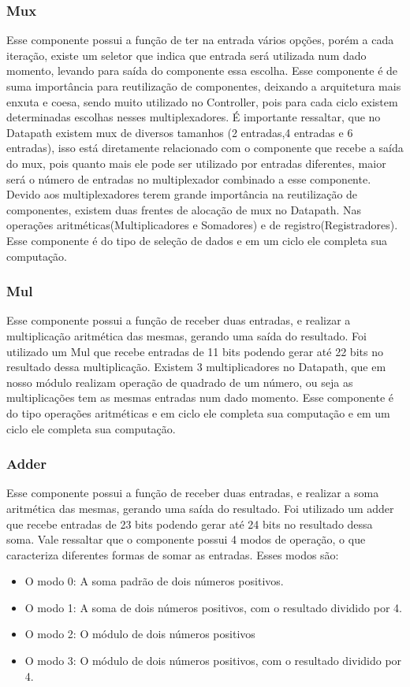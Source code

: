\subsubsection{Mux}
Esse componente possui a função de ter na entrada vários opções, porém a cada iteração, existe um seletor que indica que entrada será utilizada num dado momento, levando para saída do componente essa escolha. Esse componente é de suma importância para reutilização de componentes, deixando a arquitetura mais enxuta e coesa, sendo muito utilizado no Controller, pois para cada ciclo existem determinadas escolhas nesses multiplexadores. É importante ressaltar, que no Datapath existem mux de diversos tamanhos (2 entradas,4 entradas e 6 entradas), isso está diretamente relacionado com o componente que recebe a saída do mux, pois quanto mais ele pode ser utilizado por entradas diferentes, maior será o número de entradas no multiplexador combinado a esse componente. Devido aos multiplexadores terem grande importância na reutilização de componentes, existem duas frentes de alocação de mux no Datapath. Nas operações aritméticas(Multiplicadores e Somadores) e de registro(Registradores). Esse componente é do tipo de seleção de dados e em um ciclo ele completa sua computação.	
\subsubsection{Mul}
Esse componente possui a função de receber duas entradas, e realizar a multiplicação aritmética das mesmas, gerando uma saída do resultado. Foi utilizado um Mul que recebe entradas de 11 bits podendo gerar até 22 bits no resultado dessa multiplicação. Existem 3 multiplicadores no Datapath, que em nosso módulo realizam operação de quadrado de um número, ou seja as multiplicações tem as mesmas entradas num dado momento. Esse componente é do tipo operações aritméticas e em ciclo ele completa sua computação e em um ciclo ele completa sua computação.
\subsubsection{Adder}
Esse componente possui a função de receber duas entradas, e realizar a soma aritmética das mesmas, gerando uma saída do resultado. Foi utilizado um adder que recebe entradas de 23 bits podendo gerar até 24 bits no resultado dessa soma. Vale ressaltar que o componente possui 4 modos de operação, o que caracteriza diferentes formas de somar as entradas. Esses modos são:
\begin{itemize}
\item O modo 0: A soma padrão de dois números positivos.
\item O modo 1: A soma de dois números positivos, com o resultado dividido por 4.
\item O modo 2: O módulo de dois números positivos
\item O modo 3: O módulo de dois números positivos, com o resultado dividido por 4.
\end{itemize}

